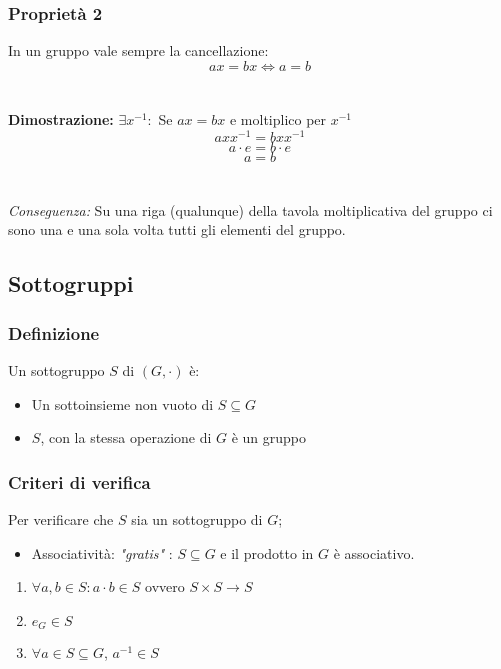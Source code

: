 \subsubsection{Proprietà 2}
In un gruppo vale sempre la cancellazione:
\[ax=bx\Leftrightarrow a=b\]
\\\\
\textbf{Dimostrazione:} \(\exists x^{-1}:\) Se \(ax=bx\) e moltiplico per \(x^{-1}\)
\[axx^{-1}=bxx^{-1}\]
\[a\cdot e=b\cdot e\]
\[a=b\]
\\\\\textit{Conseguenza:} Su una riga (qualunque) della tavola moltiplicativa del gruppo ci sono una e una sola volta tutti gli elementi del gruppo.

\subsection{Sottogruppi}

\subsubsection{Definizione}
Un sottogruppo \(S\) di \((G,\cdot)\) è:
\begin{itemize}
	\item Un sottoinsieme non vuoto di \(S\subseteq G\)
	\item \(S\), con la stessa operazione di \(G\) è un gruppo
\end{itemize}

\subsubsection{Criteri di verifica}
Per verificare che \(S\) sia un sottogruppo di \(G\);
\begin{itemize}
	\item Associatività: \textit{"gratis"} : \(S\subseteq G\) e il prodotto in \(G\) è associativo.
\end{itemize}

\begin{enumerate}

	\item \(\forall a,b \in S:a\cdot b\in S\) ovvero \(S\times S\rightarrow S\)

	\item \(e_G\in S\)

	\item \(\forall a\in S\subseteq G\),  \(a^{-1}\in S\)
\end{enumerate}

